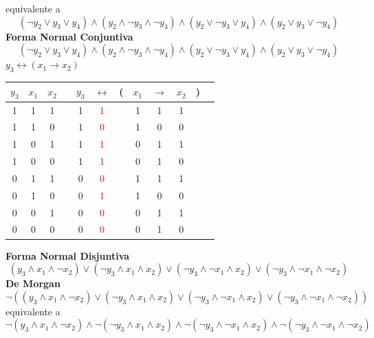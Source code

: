 \documentclass[a4paper]{article}
\begin{document}
equivalente a
\[
    \left( \neg y_{2} \lor y_{3} \lor y_{4}\right) \land \left(y_{2} \land \neg y_{3} \land \neg y_{4}\right) \land
    \left(y_{2} \lor  \neg y_{3} \lor  y_{4}\right) \land \left(y_{2} \lor y_{3} \lor \neg y_{4} \right)
\]
\textbf{Forma Normal Conjuntiva}
\[
    \left( \neg y_{2} \lor y_{3} \lor y_{4}\right) \land \left(y_{2} \land \neg y_{3} \land \neg y_{4}\right) \land
    \left(y_{2} \lor  \neg y_{3} \lor  y_{4}\right) \land \left(y_{2} \lor y_{3} \lor \neg y_{4} \right) %
\]
\(y_{3} \longleftrightarrow \left(x_{1} \longrightarrow x_{2}\right)\)
\newline
\begin{tabular}{@{ }c@{ }@{ }c@{ }@{ }c | c@{ }@{ }c@{ }@{ }c@{ }@{}c@{}@{ }c@{ }@{ }c@{ }@{ }c@{ }@{}c@{}@{ }c}
    \(y_{3}\) & \(x_{1}\) & \(x_{2}\) &  & \(y_{3}\) & $\leftrightarrow$ & ( & \(x_{1}\) & $\rightarrow$ & \(x_{2}\) & ) & \\
    \hline 
    1 & 1 & 1 &  & 1 & \textcolor{red}{1} &  & 1 & 1 & 1 &  & \\
    1 & 1 & 0 &  & 1 & \textcolor{red}{0} &  & 1 & 0 & 0 &  & \\
    1 & 0 & 1 &  & 1 & \textcolor{red}{1} &  & 0 & 1 & 1 &  & \\
    1 & 0 & 0 &  & 1 & \textcolor{red}{1} &  & 0 & 1 & 0 &  & \\
    0 & 1 & 1 &  & 0 & \textcolor{red}{0} &  & 1 & 1 & 1 &  & \\
    0 & 1 & 0 &  & 0 & \textcolor{red}{1} &  & 1 & 0 & 0 &  & \\
    0 & 0 & 1 &  & 0 & \textcolor{red}{0} &  & 0 & 1 & 1 &  & \\
    0 & 0 & 0 &  & 0 & \textcolor{red}{0} &  & 0 & 1 & 0 &  & \\
\end{tabular}
\newline
\textbf{Forma Normal Disjuntiva}
\newline
\[
    \left(y_{3} \land x_{1} \land \neg x_{2}\right) \lor \left(\neg y_{3} \land x_{1} \land x_{2}\right) \lor
    \left(\neg y_{3} \land \neg x_{1} \land x_{2}\right) \lor \left(\neg y_{3} \land \neg x_{1} \land \neg x_{2}\right)
\]
\textbf{De Morgan}
\[
    \neg \left(\left(y_{3} \land x_{1} \land \neg x_{2}\right) \lor \left(\neg y_{3} \land x_{1} \land x_{2}\right) \lor
    \left(\neg y_{3} \land \neg x_{1} \land x_{2}\right) \lor \left(\neg y_{3} \land \neg x_{1} \land \neg x_{2}\right)\right)
\]
equivalente a
\[
    \neg \left(y_{3} \land x_{1} \land \neg x_{2}\right) \land \neg \left(\neg y_{3} \land x_{1} \land x_{2}\right) \land
    \neg \left(\neg y_{3} \land \neg x_{1} \land x_{2}\right) \land \neg \left(\neg y_{3} \land \neg x_{1} \land \neg x_{2}\right)
\]
\end{document}
